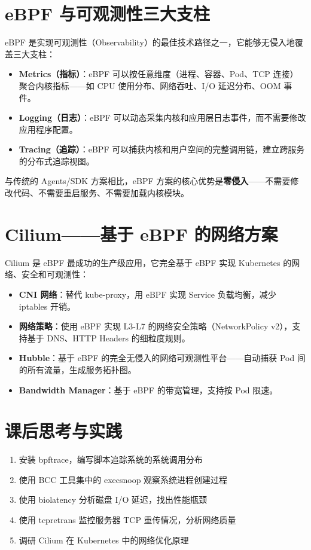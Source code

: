 \documentclass[12pt,UTF8]{ctexbook}
\begin{document}
\section{eBPF 与可观测性三大支柱}
\label{sec:ebpf-observability}

eBPF 是实现可观测性（Observability）的最佳技术路径之一，它能够无侵入地覆盖三大支柱：

\begin{itemize}
    \item \textbf{Metrics（指标）}：eBPF 可以按任意维度（进程、容器、Pod、TCP 连接）聚合内核指标——如 CPU 使用分布、网络吞吐、I/O 延迟分布、OOM 事件。
    \item \textbf{Logging（日志）}：eBPF 可以动态采集内核和应用层日志事件，而不需要修改应用程序配置。
    \item \textbf{Tracing（追踪）}：eBPF 可以捕获内核和用户空间的完整调用链，建立跨服务的分布式追踪视图。
\end{itemize}

与传统的 Agents/SDK 方案相比，eBPF 方案的核心优势是\textbf{零侵入}——不需要修改代码、不需要重启服务、不需要加载内核模块。

\section{Cilium——基于 eBPF 的网络方案}
\label{sec:ebpf-cilium}

Cilium 是 eBPF 最成功的生产级应用，它完全基于 eBPF 实现 Kubernetes 的网络、安全和可观测性：

\begin{itemize}
    \item \textbf{CNI 网络}：替代 kube-proxy，用 eBPF 实现 Service 负载均衡，减少 iptables 开销。
    \item \textbf{网络策略}：使用 eBPF 实现 L3-L7 的网络安全策略（NetworkPolicy v2），支持基于 DNS、HTTP Headers 的细粒度规则。
    \item \textbf{Hubble}：基于 eBPF 的完全无侵入的网络可观测性平台——自动捕获 Pod 间的所有流量，生成服务拓扑图。
    \item \textbf{Bandwidth Manager}：基于 eBPF 的带宽管理，支持按 Pod 限速。
\end{itemize}

\section{课后思考与实践}
\label{sec:ebpf-practice}
\begin{enumerate}
    \item 安装 bpftrace，编写脚本追踪系统的系统调用分布
    \item 使用 BCC 工具集中的 execsnoop 观察系统进程创建过程
    \item 使用 biolatency 分析磁盘 I/O 延迟，找出性能瓶颈
    \item 使用 tcpretrans 监控服务器 TCP 重传情况，分析网络质量
    \item 调研 Cilium 在 Kubernetes 中的网络优化原理
\end{enumerate}
\end{document}
